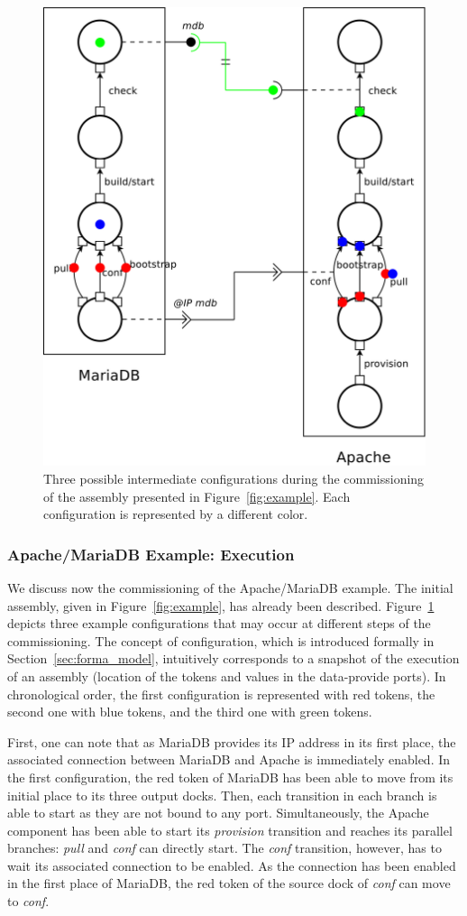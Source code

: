 \begin{figure}[tbp]
  \begin{center}
    \includegraphics[width=0.7\linewidth]{./images/scenari.pdf}
  \end{center}
  \caption{Three possible intermediate configurations during the commissioning
  of the assembly presented in Figure~\ref{fig:example}. Each configuration is
  represented by a different color.}
  \label{fig:scenari}
\end{figure}

\subsubsection*{Apache/MariaDB Example: \mad Execution}

We discuss now the commissioning of the Apache/MariaDB
example.  The initial assembly, given in Figure~\ref{fig:example}, has
already been described. Figure~\ref{fig:scenari} depicts three example
configurations that may occur at different steps of the commissioning.
The concept of configuration, which is introduced formally in
Section~\ref{sec:forma_model}, intuitively corresponds to a snapshot of
the execution of an assembly (location of the tokens and values
in the data-provide ports). In chronological order, the first
configuration is represented with red tokens, the second one with blue
tokens, and the third one with green tokens.

First, one can note that as MariaDB provides its IP address in its
first place, the associated connection between MariaDB and Apache is
immediately enabled. In the first configuration, the red token of MariaDB
has been able to move from its initial place to its three output
docks. Then, each transition in each branch is able to start as they
are not bound to any port. Simultaneously, the Apache component has
been able to start its \emph{provision} transition and reaches its
parallel branches: \emph{pull} and \emph{conf} can directly start. The
\emph{conf} transition, however, has to wait its associated connection
to be enabled. As the connection has been enabled in the first place
of MariaDB, the red token of the source dock of \emph{conf} can move
to \emph{conf}.


